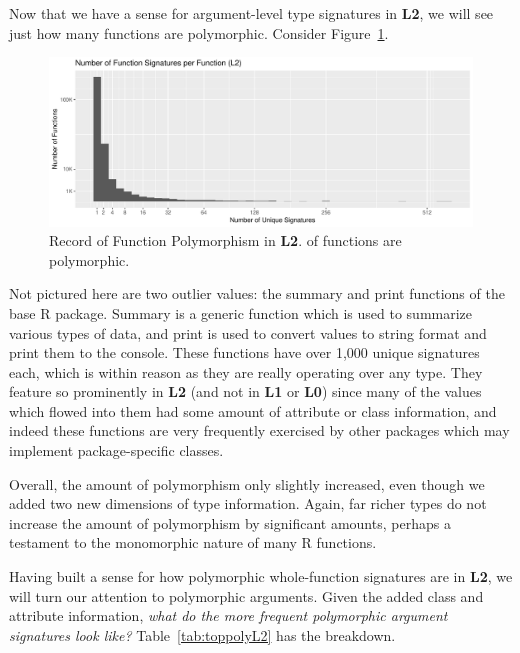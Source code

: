 \documentclass[acmsmall,10pt,review,anonymous]{acmart}\settopmatter{printfolios=true,printccs=false,printacmref=false}
\begin{document}
Now that we have a sense for argument-level type signatures in {\bf L2}, we will see just how many functions are polymorphic.
Consider Figure~\ref{fig:L2funcounts}.

\begin{figure}[htbp]\begin{center}
\includegraphics[width=.9\textwidth]{L2_by_fun}
\caption{Record of Function Polymorphism in {\bf L2}. \LTWOPERCPOLY of functions are polymorphic.}
\label{fig:L2funcounts}\end{center}
\end{figure}

Not pictured here are two outlier values: the summary and print functions of the base R package.
Summary is a generic function which is used to summarize various types of data, and print is used to convert values to string format and print them to the console.
These functions have over 1,000 unique signatures each, which is within reason as they are really operating over any type.
They feature so prominently in {\bf L2} (and not in {\bf L1} or {\bf L0}) since many of the values which flowed into them had some amount of attribute or class information, and indeed these functions are very frequently exercised by other packages which may implement package-specific classes.

Overall, the amount of polymorphism only slightly increased, even though we added two new dimensions of type information.
Again, far richer types do not increase the amount of polymorphism by significant amounts, perhaps a testament to the monomorphic nature of many R functions.

Having built a sense for how polymorphic whole-function signatures are in {\bf L2}, we will turn our attention to polymorphic arguments.
Given the added class and attribute information, {\it what do the more frequent polymorphic argument signatures look like?}
Table~\ref{tab:toppolyL2} has the breakdown.
\end{document}
